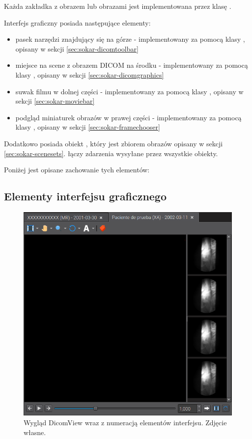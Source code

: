 \label{sec:sokar-dicomview}
Każda zakładka z obrazem lub obrazami jest implementowana przez klasę .

Interfejs graficzny  posiada następujące elementy:
\begin{itemize}
    \item pasek narzędzi znajdujący się na górze - implementowany za pomocą klasy , opisany w sekcji \ref{sec:sokar-dicomtoolbar}
    \item miejsce na scene z obrazem DICOM na środku - implementowany za pomocą klasy , opisany w sekcji \ref{sec:sokar-dicomgraphics}
    \item suwak filmu w dolnej części - implementowany za pomocą klasy , opisany w sekcji \ref{sec:sokar-moviebar}
    \item podgląd miniaturek obrazów w prawej części - implementowany za pomocą klasy , opisany w sekcji \ref{sec:sokar-framechooser}
\end{itemize}

Dodatkowo posiada obiekt , który jest zbiorem obrazów opisany w sekcji \ref{sec:sokar-scenesets}.
 łączy zdarzenia wysyłane przez wszystkie obiekty.

Poniżej jest opisane zachowanie tych elementów:

\subsection{Elementy interfejsu graficznego}

\begin{figure}[!htbp]
    \centering
    \includegraphics[width=\textwidth]{img/sokar-dicomview-001.png}
    \caption{Wygląd DicomView wraz z numeracją elementów interfejsu. Zdjęcie własne.}
    \label{fig:sokar-dicomview001}
\end{figure}

